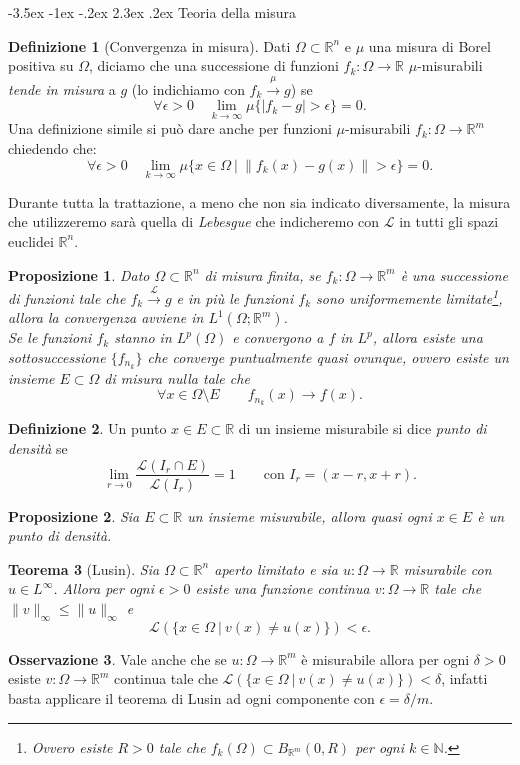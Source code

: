 \documentclass[a4paper,11pt]{book}
\makeatletter
\theoremstyle{plain}
\newtheorem{teo}{Teorema}[chapter]
\newtheorem{prop}[teo]{Proposizione}
\theoremstyle{definition}
\newtheorem{defn}{Definizione}[chapter]
\newtheorem{oss}[defn]{Osservazione}
\theoremstyle{remark}
\newcommand{\R}{\mathbb{R}}
\newcommand{\N}{\mathbb{N}}
\newcommand{\LL}{\mathscr{L}}
\newcommand{\norm}[1]{\lVert#1\rVert}
\renewcommand\section{\@startsection {section}{1}{\z@}%
                                   {-3.5ex \@plus -1ex \@minus -.2ex}%
                                   {2.3ex \@plus.2ex}%
                                   {\normalfont\Large\bfseries}}
\makeatother
\begin{document}
\section{Teoria della misura}
\begin{defn}[Convergenza in misura]
	Dati $\Omega\subset \R^n$ e $\mu$ una misura di Borel positiva su $\Omega$, diciamo che una successione di funzioni $f_k:\Omega\to\R$ $\mu$-misurabili \textit{tende in misura} a $g$ (lo indichiamo con $f_k\xrightarrow{\mu}g$) se
	\[
		\forall \epsilon>0\quad \lim_{k\to\infty} \mu\{|f_k-g|>\epsilon\} = 0.
	\]
	Una definizione simile si può dare anche per funzioni $\mu$-misurabili $f_{k}:\Omega\to\R^{m}$ chiedendo che:
	\[
		\forall \epsilon>0\quad \lim_{k\to\infty} \mu\{x\in\Omega\ |\ \norm{f_k(x)-g(x)}>\epsilon\} = 0.
	\]
\end{defn}
Durante tutta la trattazione, a meno che non sia indicato diversamente, la misura che utilizzeremo sarà quella di \textit{Lebesgue} che indicheremo con $\LL$ in tutti gli spazi euclidei $\R^n$.
\begin{prop}\label{prop:4}
	Dato $\Omega\subset\R^{n}$ di misura finita, se $f_{k}:\Omega\to\R^{m}$ è una successione di funzioni tale che $f_{k}\xrightarrow{\LL}g$ e in più le funzioni $f_{k}$ sono uniformemente limitate\footnote{Ovvero esiste $R>0$ tale che $f_{k}(\Omega)\subset B_{\R^{m}}(0,R)$ per ogni $k\in\N$.}, allora la convergenza avviene in $L^{1}(\Omega;\R^{m})$.\\
	Se le funzioni $f_{k}$ stanno in $L^{p}(\Omega)$ e convergono a $f$ in $L^{p}$, allora esiste una sottosuccessione $\{f_{n_{k}}\}$ che converge puntualmente quasi ovunque, ovvero esiste un insieme $E\subset \Omega$ di misura nulla tale che
	\[
		\forall x\in \Omega\setminus E\qquad f_{n_{k}}(x)\to f(x).
	\]
\end{prop}
\begin{defn}
	Un punto $x\in E\subset \R$ di un insieme misurabile si dice \textit{punto di densità} se
	\[
		\lim_{r\to0} \frac{\LL(I_r\cap E)}{\LL(I_r)} = 1\qquad \text{con }I_r = (x-r,x+r).
	\]
\end{defn}
\begin{prop}
	Sia $E\subset\R$ un insieme misurabile, allora quasi ogni $x\in E$ è un punto di densità.
\end{prop}
\begin{teo}[Lusin]\label{teo:10}
	Sia $\Omega\subset \R^{n}$ aperto limitato e sia $u:\Omega\to\R$ misurabile con $u\in L^{\infty}$. Allora per ogni $\epsilon>0$ esiste una funzione continua $v:\Omega\to\R$ tale che $\norm{v}_{\infty}\leq\norm{u}_{\infty}$ e
	\[
		\LL(\{x\in\Omega\ |\ v(x)\neq u(x)\})<\epsilon.
	\]
\end{teo}
\begin{oss}
	Vale anche che se $u:\Omega\to\R^{m}$ è misurabile allora per ogni $\delta>0$ esiste $v:\Omega\to\R^{m}$ continua tale che $\LL(\{x\in\Omega\ |\ v(x)\neq u(x)\})<\delta$, infatti basta applicare il teorema di Lusin ad ogni componente con $\epsilon=\delta/m$.
\end{oss}
\end{document}
